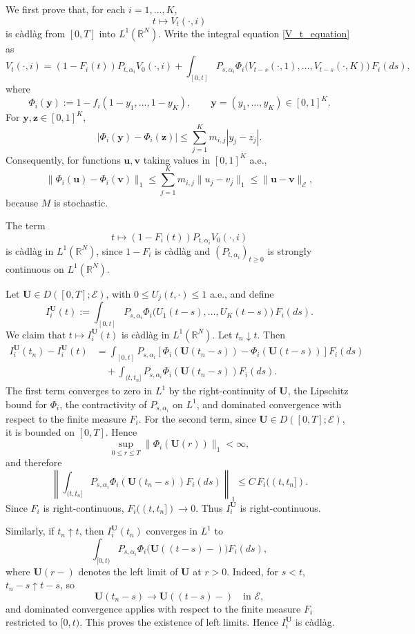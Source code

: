 \documentclass[reqno,final,11pt]{amsart}
\newcommand{\1}{\mathbbm{1}}
\theoremstyle{plain}
\theoremstyle{definition}
\theoremstyle{remark}
\begin{document}
We first prove that, for each \(i=1,\ldots,K\),
\[
t\mapsto V_t(\cdot,i)
\]
is càdlàg from \([0,T]\) into \(L^1(\mathbb R^N)\). Write the integral
equation \eqref{V_t_equation} as
\[
V_t(\cdot,i)
=
(1-F_i(t))P_{t,\alpha_i}V_0(\cdot,i)
+
\int_{[0,t]}
P_{s,\alpha_i}
\Phi_i\bigl(V_{t-s}(\cdot,1),\ldots,V_{t-s}(\cdot,K)\bigr)
\,F_i(ds),
\]
where
\[
\Phi_i(\mathbf y):=
1-f_i(1-y_1,\ldots,1-y_K),
\qquad
\mathbf y=(y_1,\ldots,y_K)\in[0,1]^K .
\]
For \(\mathbf y,\mathbf z\in[0,1]^K\),
\[
|\Phi_i(\mathbf y)-\Phi_i(\mathbf z)|
\le
\sum_{j=1}^K m_{i,j}|y_j-z_j|.
\]
Consequently, for functions \(\mathbf u,\mathbf v\) taking values in
\([0,1]^K\) a.e.,
\[
\|\Phi_i(\mathbf u)-\Phi_i(\mathbf v)\|_1
\le
\sum_{j=1}^K m_{i,j}\|u_j-v_j\|_1
\le
\|\mathbf u-\mathbf v\|_{\mathcal E},
\]
because \(M\) is stochastic.

The term
\[
t\mapsto (1-F_i(t))P_{t,\alpha_i}V_0(\cdot,i)
\]
is càdlàg in \(L^1(\mathbb R^N)\), since \(1-F_i\) is càdlàg and
\((P_{t,\alpha_i})_{t\ge0}\) is strongly continuous on \(L^1(\mathbb R^N)\).

Let \(\mathbf U\in D([0,T];\mathcal E)\), with \(0\le U_j(t,\cdot)\le1\)
a.e., and define
\[
I_i^{\mathbf U}(t)
:=
\int_{[0,t]}
P_{s,\alpha_i}
\Phi_i\bigl(U_1(t-s),\ldots,U_K(t-s)\bigr)
\,F_i(ds).
\]
We claim that \(t\mapsto I_i^{\mathbf U}(t)\) is càdlàg in
\(L^1(\mathbb R^N)\). Let \(t_n\downarrow t\). Then
\[
\begin{aligned}
I_i^{\mathbf U}(t_n)-I_i^{\mathbf U}(t)
&=
\int_{[0,t]}
P_{s,\alpha_i}
\left[
\Phi_i(\mathbf U(t_n-s))-\Phi_i(\mathbf U(t-s))
\right]
F_i(ds)
\\
&\quad+
\int_{(t,t_n]}
P_{s,\alpha_i}
\Phi_i(\mathbf U(t_n-s))
F_i(ds).
\end{aligned}
\]
The first term converges to zero in \(L^1\) by the right-continuity of
\(\mathbf U\), the Lipschitz bound for \(\Phi_i\), the contractivity of
\(P_{s,\alpha_i}\) on \(L^1\), and dominated convergence with respect to the
finite measure \(F_i\). For the second term, since
\(\mathbf U\in D([0,T];\mathcal E)\), it is bounded on \([0,T]\). Hence
\[
\sup_{0\le r\le T}
\|\Phi_i(\mathbf U(r))\|_1<\infty,
\]
and therefore
\[
\left\|
\int_{(t,t_n]}
P_{s,\alpha_i}
\Phi_i(\mathbf U(t_n-s))
F_i(ds)
\right\|_1
\le
C\,F_i((t,t_n]).
\]
Since \(F_i\) is right-continuous, \(F_i((t,t_n])\to0\). Thus
\(I_i^{\mathbf U}\) is right-continuous.

Similarly, if \(t_n\uparrow t\), then \(I_i^{\mathbf U}(t_n)\) converges in
\(L^1\) to
\[
\int_{[0,t)}
P_{s,\alpha_i}
\Phi_i\bigl(\mathbf U((t-s)-)\bigr)
F_i(ds),
\]
where \(\mathbf U(r-)\) denotes the left limit of \(\mathbf U\) at \(r>0\).
Indeed, for \(s<t\), \(t_n-s\uparrow t-s\), so
\[
\mathbf U(t_n-s)\longrightarrow \mathbf U((t-s)-)
\quad\text{in }\mathcal E,
\]
and dominated convergence applies with respect to the finite measure
\(F_i\) restricted to \([0,t)\). This proves the existence of left limits.
Hence \(I_i^{\mathbf U}\) is càdlàg.
\end{document}
